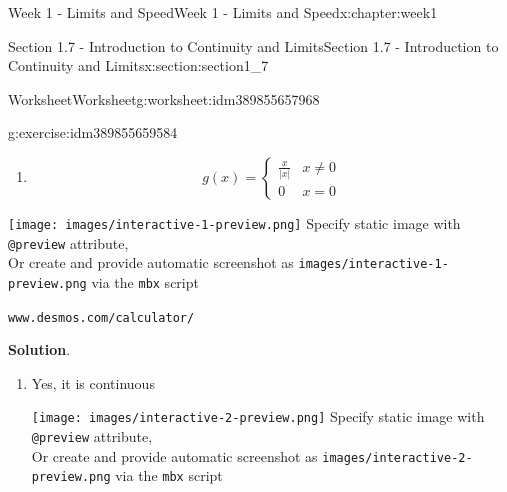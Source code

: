 \documentclass[oneside,10pt,]{book}
\newcommand{\blocktitlefont}{\relax}
\newcommand{\mono}[1]{\texttt{#1}}
\numberwithin{equation}{section}
\newlength{\qrsize}
\newlength{\previewwidth}
\begin{document}
\begin{chapterptx}{Week 1 - Limits and Speed}{}{Week 1 - Limits and Speed}{}{}{x:chapter:week1}
\begin{sectionptx}{Section 1.7 - Introduction to Continuity and Limits}{}{Section 1.7 - Introduction to Continuity and Limits}{}{}{x:section:section1_7}
\begin{worksheet-subsection}{Worksheet}{}{Worksheet}{}{}{g:worksheet:idm389855657968}
\begin{divisionexercise}{1}{}{}{g:exercise:idm389855659584}
\begin{enumerate}[label=(\alph*)]
\begin{equation*}
\end{equation*}
%
\item{}%
\begin{equation*}
g(x) = \left\{ \begin{matrix} \frac x{\left\vert x \right\vert} & x \neq 0 \\ 0 & x = 0 \end{matrix} \right. 
\end{equation*}
%
\end{enumerate}
\setlength{\qrsize}{9em}
\setlength{\previewwidth}{\linewidth}
\addtolength{\previewwidth}{-\qrsize}
\begin{tcbraster}[raster columns=2, raster column skip=1pt, raster halign=center, raster force size=false, raster left skip=0pt, raster right skip=0pt]%
\begin{tcolorbox}[previewstyle, width=\previewwidth]%
%
{\texttt{[image: images/interactive-1-preview.png]}}%
{\small{}Specify static image with \mono{@preview} attribute,\\Or create and provide automatic screenshot as \mono{images/interactive-1-preview.png} via the \mono{mbx} script}%
\end{tcolorbox}%
\begin{tcolorbox}[qrstyle]%
{\hypersetup{urlcolor=black}}%
\end{tcolorbox}%
\begin{tcolorbox}[captionstyle]%
\small \mono{www.desmos.com/calculator/}\end{tcolorbox}%
\end{tcbraster}%
%
\textbf{\blocktitlefont Solution}.\hypertarget{g:solution:idm389855675040}{}\quad{}%
\begin{enumerate}[label=(\alph*)]
\item{}Yes, it is continuous%
\par
\setlength{\qrsize}{9em}
\setlength{\previewwidth}{\linewidth}
\addtolength{\previewwidth}{-\qrsize}
\begin{tcbraster}[raster columns=2, raster column skip=1pt, raster halign=center, raster force size=false, raster left skip=0pt, raster right skip=0pt]%
\begin{tcolorbox}[previewstyle, width=\previewwidth]%
%
{\texttt{[image: images/interactive-2-preview.png]}}%
{\small{}Specify static image with \mono{@preview} attribute,\\Or create and provide automatic screenshot as \mono{images/interactive-2-preview.png} via the \mono{mbx} script}%

\end{tcolorbox}
\end{tcbraster}
\end{enumerate}
\end{divisionexercise}
\end{worksheet-subsection}
\end{sectionptx}
\end{chapterptx}
\end{document}
